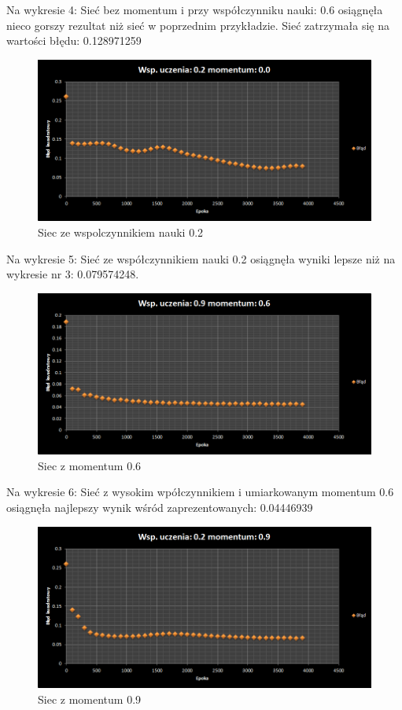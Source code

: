 \documentclass{classrep}
\begin{document}
Na wykresie 4: Sieć bez momentum i przy współczynniku nauki: 0.6 osiągnęła nieco gorszy rezultat niż sieć w poprzednim przykładzie. Sieć zatrzymała się na wartości błędu: 0.128971259

\begin{figure}[ht]
\centering
			\includegraphics[scale=0.65]{pictures/test05.png}
	\caption{Siec ze wspolczynnikiem nauki 0.2}
	\label{fig:Siec ze wspolczynnikiem nauki 0.2}
\end{figure}

Na wykresie 5: Sieć ze współczynnikiem nauki 0.2 osiągnęła wyniki lepsze niż na wykresie nr 3: 
0.079574248. 

\begin{figure}[ht]
\centering
			\includegraphics[scale=0.65]{pictures/test06.png}
	\caption{Siec z momentum 0.6}
	\label{fig:Siec z momentum 0.6}
\end{figure}

Na wykresie 6: Sieć z wysokim wpółczynnikiem i umiarkowanym momentum 0.6 osiągnęła najlepszy wynik wśród zaprezentowanych: 0.04446939


\begin{figure}[ht]
\centering
			\includegraphics[scale=0.65]{pictures/test07.png}
	\caption{Siec z momentum 0.9}
	\label{fig:Siec z momentum 0.9}
\end{figure}
\end{document}
